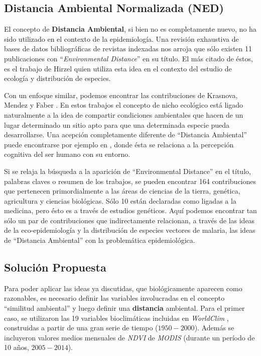 \subsection{Distancia Ambiental Normalizada (NED)}

  \par El concepto de \textbf{Distancia Ambiental}, si bien no es completamente nuevo,
    no ha sido utilizado en el contexto de la epidemiología. Una revisión
    exhaustiva de bases de datos bibliográficas de revistas indexadas nos
    arroja que sólo existen 11 publicaciones con ``\textit{Environmental Distance}”
    en su título. El más citado de éstos, es el trabajo de Hirzel \cite{hirzel_distance}
    quien utiliza esta idea en el contexto del estudio de ecología y
    distribución de especies.

  \par Con un enfoque similar, podemos encontrar las contribuciones de Krasnova,
    Mendez y Faber \cite{krasnova_similarity, mendez_distance, farber_modeling}.
    En estos trabajos el concepto de nicho ecológico está ligado naturalmente a
    la idea de compartir condiciones ambientales que hacen de un lugar determinado
    un sitio apto para que una determinada especie pueda desarrollarse.
    Una acepción completamente diferente de ``Distancia Ambiental” puede
    encontrarse por ejemplo en \cite{montello_cognition}, donde ésta se relaciona
    a la percepción cognitiva del ser humano con su entorno.

  \par Si se relaja la búsqueda a la aparición de ``Environmental Distance” en el
    título, palabras claves o resumen de los trabajos, se pueden encontrar 164
    contribuciones que pertenecen primordialmente a las áreas de ciencias de la
    tierra, genética, agricultura y ciencias biológicas.
    Sólo 10 están declaradas como ligadas a la medicina, pero ésto es a través
    de estudios genéticos. Aquí podemos encontrar tan sólo un par de
    contribuciones \cite{tatem_env_coverage, altamirada_genetic} que
    indirectamente relacionan, a través de las ideas de la
    eco-epidemiología y la distribución de especies vectores de malaria,
    las ideas de ``Distancia Ambiental” con la problemática epidemiológica.

\subsection{Solución Propuesta}
  \par Para poder aplicar las ideas ya discutidas, que biológicamente aparecen
    como razonables, es necesario definir las variables involucradas en el
    concepto ``similitud ambiental” y luego definir una \textbf{distancia} ambiental.
    Para el primer caso, se utilizaron las 19 variables bioclimáticas incluidas en
    \textit{WorldClim} \cite{wordclim}, construidas a partir de una gran serie
    de tiempo ($1950-2000$).
    Además se incluyeron valores medios mensuales de \textit{NDVI} de
    \textit{MODIS} (durante un período de 10 años, $2005-2014$).

